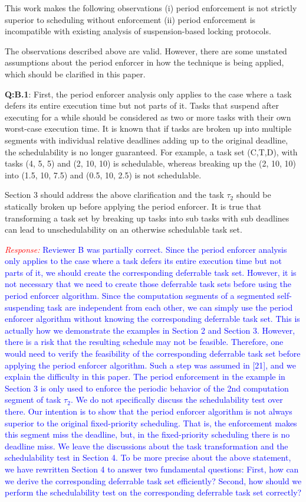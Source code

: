 \documentclass[12pt]{article}
\newcommand{\response}[1]{\textcolor{red}{\emph{Response: }} \textcolor{blue}{#1}\vspace{0.25in}}
\begin{document}
	This work makes the following observations
(i) period enforcement is not strictly superior to scheduling without
enforcement
(ii) period enforcement is incompatible with existing analysis of
suspension-based locking protocols.

The observations described above are valid. However, there are some unstated
assumptions about the period enforcer in how the technique is being applied,
which should be clarified in this paper.

{\bf Q:B.1}:    
First, the period enforcer analysis only applies to the case where a task
defers its entire execution time but not parts of it. Tasks that suspend
after executing for a while should be considered as two or more tasks with
their own worst-case execution time. It is known that if tasks are broken up
into multiple segments with individual relative deadlines adding up to the
original deadline, the schedulability is no longer guaranteed. For example,
a task set (C,T,D), with tasks (4, 5, 5) and (2, 10, 10) is schedulable,
whereas breaking up the (2, 10, 10) into (1.5, 10, 7.5) and (0.5, 10, 2.5)
is not schedulable.

Section 3 should address the above clarification and the task $\tau_2$ should
be statically broken up before applying the period enforcer. It is true that
transforming a task set by breaking up tasks into sub tasks with sub
deadlines can lead to unschedulability on an otherwise schedulable task set.

\response{
Reviewer B was partially correct. Since the period enforcer analysis only applies to the case where a task defers its entire execution time but not parts of it, we should create the corresponding deferrable task set. However, it is not necessary that we need to create those deferrable task sets before using the period enforcer algorithm. Since the computation segments of a segmented self-suspending task are independent from each other, we can simply use the period enforcer algorithm without knowing the corresponding deferrable task set. This is actually how we demonstrate the examples in Section 2 and Section 3. However, there is a risk that the resulting schedule may not be feasible. Therefore, one would need to verify the feasibility of the corresponding deferrable task set before applying the period enforcer algorithm. Such a step was assumed in [21], and we explain the difficulty in this paper. The period enforcement in the example in Section 3 is only used to enforce the periodic behavior of the 2nd computation segment of task $\tau_2$. We do not specifically discuss the schedulability test over there. Our intention is to show that the period enforcer algorithm is not always superior to the original fixed-priority scheduling. That is, the enforcement makes this segment miss the deadline, but, in the fixed-priority scheduling there is no deadline miss. We leave the discussions about the task transformation and the schedulability test in Section 4. To be more precise about the above statement, we have rewritten Section 4 to answer two fundamental questions: First, how can we derive the corresponding deferrable task set efficiently? Second, how should we perform the schedulability test on the corresponding deferrable task set correctly?
}
\end{document}
